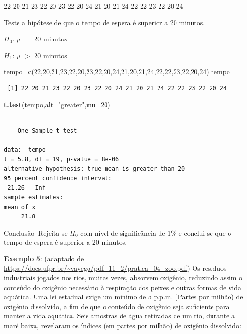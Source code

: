 \documentclass[12pt,brazil,oneside]{book}
\newenvironment{Shaded}{\begin{snugshade}}{\end{snugshade}}
\newcommand{\DataTypeTok}[1]{\textcolor[rgb]{0.13,0.29,0.53}{#1}}
\newcommand{\DecValTok}[1]{\textcolor[rgb]{0.00,0.00,0.81}{#1}}
\newcommand{\KeywordTok}[1]{\textcolor[rgb]{0.13,0.29,0.53}{\textbf{#1}}}
\newcommand{\NormalTok}[1]{#1}
\newcommand{\StringTok}[1]{\textcolor[rgb]{0.31,0.60,0.02}{#1}}
\begin{document}
22 20 21 23 22 20 23 22 20 24 21 20 21 24 22 22 23 22 20 24

Teste a hipótese de que o tempo de espera é superior a 20 minutos.

\textbf{\(H_0\)}: \(\mu\) \(=\) 20 minutos

\textbf{\(H_1\)}: \(\mu\) \(>\) 20 minutos

\begin{Shaded}
\begin{Highlighting}[]
\NormalTok{tempo=}\KeywordTok{c}\NormalTok{(}\DecValTok{22}\NormalTok{,}\DecValTok{20}\NormalTok{,}\DecValTok{21}\NormalTok{,}\DecValTok{23}\NormalTok{,}\DecValTok{22}\NormalTok{,}\DecValTok{20}\NormalTok{,}\DecValTok{23}\NormalTok{,}\DecValTok{22}\NormalTok{,}\DecValTok{20}\NormalTok{,}\DecValTok{24}\NormalTok{,}\DecValTok{21}\NormalTok{,}\DecValTok{20}\NormalTok{,}\DecValTok{21}\NormalTok{,}\DecValTok{24}\NormalTok{,}\DecValTok{22}\NormalTok{,}\DecValTok{22}\NormalTok{,}\DecValTok{23}\NormalTok{,}\DecValTok{22}\NormalTok{,}\DecValTok{20}\NormalTok{,}\DecValTok{24}\NormalTok{)}
\NormalTok{tempo}
\end{Highlighting}
\end{Shaded}

\begin{verbatim}
 [1] 22 20 21 23 22 20 23 22 20 24 21 20 21 24 22 22 23 22 20 24
\end{verbatim}

\begin{Shaded}
\begin{Highlighting}[]
\KeywordTok{t.test}\NormalTok{(tempo,}\DataTypeTok{alt=}\StringTok{"greater"}\NormalTok{,}\DataTypeTok{mu=}\DecValTok{20}\NormalTok{)}
\end{Highlighting}
\end{Shaded}

\begin{verbatim}

    One Sample t-test

data:  tempo
t = 5.8, df = 19, p-value = 8e-06
alternative hypothesis: true mean is greater than 20
95 percent confidence interval:
 21.26   Inf
sample estimates:
mean of x 
     21.8 
\end{verbatim}

Conclusão: Rejeita-se \(H_0\) com nível de significância de 1\% e conclui-se que o tempo de espera é superior a 20 minutos.

\textbf{Exemplo 5}: (adaptado de \url{https://docs.ufpr.br/~vayego/pdf_11_2/pratica_04_zoo.pdf}) Os resíduos industriais jogados nos rios, muitas vezes, absorvem oxigênio, reduzindo assim o conteúdo do oxigênio necessário à respiração dos peixes e outras formas de vida aquática. Uma lei estadual exige um mínimo de 5 p.p.m. (Partes por milhão) de oxigênio dissolvido, a fim de que o conteúdo de oxigênio seja suficiente para manter a vida aquática. Seis amostras de água retiradas de um rio, durante a maré baixa, revelaram os índices (em partes por milhão) de oxigênio dissolvido:
\end{document}
